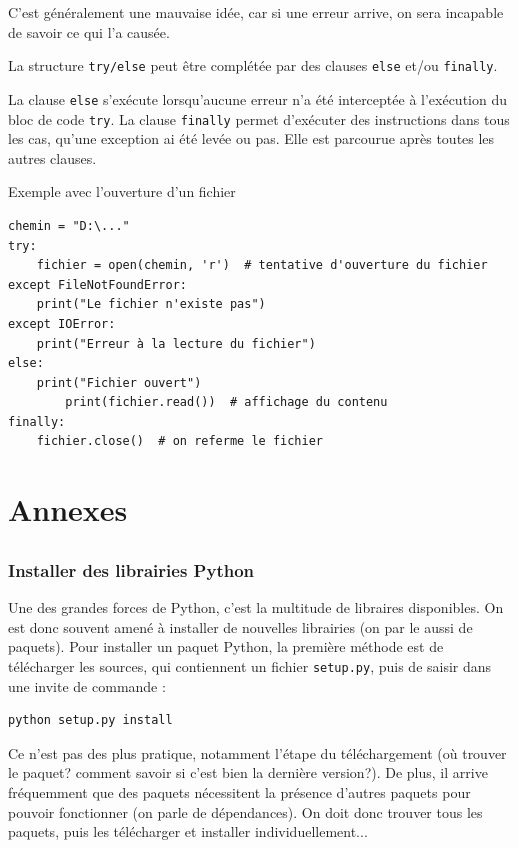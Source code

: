\documentclass[12pt, a4paper]{article}
\begin{document}
C'est généralement une mauvaise idée, car si une erreur arrive, on sera incapable de savoir ce qui l'a causée.

La structure \lstinline{try/else} peut être complétée par des clauses \lstinline{else} et/ou \lstinline{finally}.

La clause \lstinline{else} s'exécute lorsqu'aucune erreur n'a été interceptée à l'exécution du bloc de code \lstinline{try}. La clause \lstinline{finally} permet d'exécuter des instructions dans tous les cas, qu'une exception ai été levée ou pas. Elle est parcourue après toutes les autres clauses.

Exemple avec l'ouverture d'un fichier 
\begin{lstlisting}
chemin = "D:\..."
try:
    fichier = open(chemin, 'r')  # tentative d'ouverture du fichier
except FileNotFoundError:
    print("Le fichier n'existe pas")
except IOError:
    print("Erreur à la lecture du fichier")
else:
    print("Fichier ouvert")
		print(fichier.read())  # affichage du contenu
finally:
    fichier.close()  # on referme le fichier
\end{lstlisting}






\newpage
\part{Annexes}
\chapter{}

\section*{Installer des librairies Python}
\label{sec:install_paquets_python}
Une des grandes forces de Python, c'est la multitude de libraires disponibles. On est donc souvent amené à installer de nouvelles librairies (on par le aussi de paquets). Pour installer un paquet Python, la première méthode est de télécharger les sources, qui contiennent un fichier \lstinline{setup.py}, puis de saisir dans une invite de commande :
\begin{lstlisting}
python setup.py install
\end{lstlisting}

Ce n'est pas des plus pratique, notamment l'étape du téléchargement (où trouver le paquet? comment savoir si c'est bien la dernière version?). De plus, il arrive fréquemment que des paquets nécessitent la présence d'autres paquets pour pouvoir fonctionner (on parle de dépendances). On doit donc trouver tous les paquets, puis les télécharger et installer individuellement...
\end{document}
